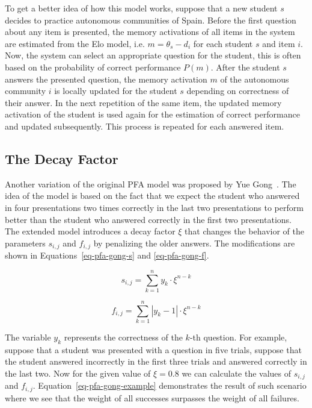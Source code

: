 To get a better idea of how this model works, suppose that a new student $s$ decides to practice autonomous communities of Spain. Before the first question about any item is presented, the memory activations of all items in the system are estimated from the Elo model, i.e. $m = \theta_s - d_i$ for each student $s$ and item $i$. Now, the system can select an appropriate question for the student, this is often based on the probability of correct performance $P(m)$. After the student $s$ answers the presented question, the memory activation $m$ of the autonomous community $i$ is locally updated for the student $s$ depending on correctness of their answer. In the next repetition of the same item, the updated memory activation of the student is used again for the estimation of correct performance and updated subsequently. This process is repeated for each answered item.

\subsection*{The Decay Factor}
\label{pfag}

Another variation of the original PFA model was proposed by Yue Gong~\cite{Gong2011}. The idea of the model is based on the fact that we expect the student who answered in four presentations two times correctly in the last two presentations to perform better than the student who answered correctly in the first two presentations. The extended model introduces a decay factor $\xi$ that changes the behavior of the parameters $s_{i,j}$ and $f_{i,j}$ by penalizing the older answers. The modifications are shown in Equations~\ref{eq-pfa-gong-s} and \ref{eq-pfa-gong-f}.

\begin{equation} \label{eq-pfa-gong-s}
  s_{i,j} = \sum_{k=1}^{n} y_k \cdot \xi^{n-k}
\end{equation}

\begin{equation} \label{eq-pfa-gong-f}
  f_{i,j} = \sum_{k=1}^{n} |y_k - 1| \cdot \xi^{n-k}
\end{equation}

The variable $y_k$ represents the correctness of the $k$-th question. For example, suppose that a student was presented with a question in five trials, suppose that the student answered incorrectly in the first three trials and answered correctly in the last two. Now for the given value of $\xi = 0.8$ we can calculate the values of $s_{i,j}$ and $f_{i,j}$. Equation~\ref{eq-pfa-gong-example} demonstrates the result of such scenario where we see that the weight of all successes surpasses the weight of all failures.

